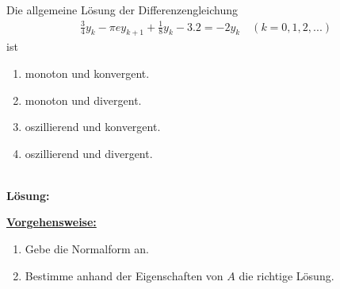 \newpage



\subsection*{}
Die allgemeine Lösung der Differenzengleichung
\begin{align*}
\frac{3}{4} y_k - \pi  e y_{k+1} + \frac{1}{8} y_k -3.2 = -2 y_k \quad (k=0,1,2,...)
\end{align*}
ist
\renewcommand{\labelenumi}{(\alph{enumi})}
\begin{enumerate}
	\item
	monoton und konvergent.
	\item
	monoton und divergent.	
	\item 
	oszillierend und konvergent.
	\item
	oszillierend und divergent.
\end{enumerate}
\ \\
\textbf{Lösung:}
\begin{mdframed}
\underline{\textbf{Vorgehensweise:}}
\renewcommand{\labelenumi}{\theenumi.}
\begin{enumerate}
\item Gebe die Normalform an.
\item Bestimme anhand der Eigenschaften von $ A $ die richtige Lösung.
\end{enumerate}
\end{mdframed}

